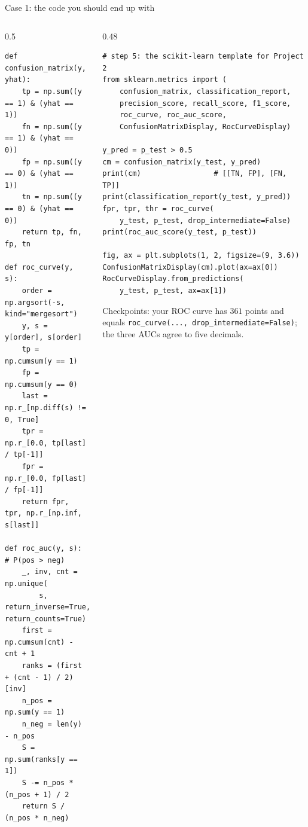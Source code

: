 \documentclass[10pt,aspectratio=169]{beamer}
\begin{document}
\begin{frame}[fragile]{Case 1: the code you should end up with}
\begin{columns}[T]
\begin{column}{0.5\textwidth}
\begin{lstlisting}
def confusion_matrix(y, yhat):
    tp = np.sum((y == 1) & (yhat == 1))
    fn = np.sum((y == 1) & (yhat == 0))
    fp = np.sum((y == 0) & (yhat == 1))
    tn = np.sum((y == 0) & (yhat == 0))
    return tp, fn, fp, tn

def roc_curve(y, s):
    order = np.argsort(-s, kind="mergesort")
    y, s = y[order], s[order]
    tp = np.cumsum(y == 1)
    fp = np.cumsum(y == 0)
    last = np.r_[np.diff(s) != 0, True]
    tpr = np.r_[0.0, tp[last] / tp[-1]]
    fpr = np.r_[0.0, fp[last] / fp[-1]]
    return fpr, tpr, np.r_[np.inf, s[last]]

def roc_auc(y, s):            # P(pos > neg)
    _, inv, cnt = np.unique(
        s, return_inverse=True, return_counts=True)
    first = np.cumsum(cnt) - cnt + 1
    ranks = (first + (cnt - 1) / 2)[inv]
    n_pos = np.sum(y == 1)
    n_neg = len(y) - n_pos
    S = np.sum(ranks[y == 1])
    S -= n_pos * (n_pos + 1) / 2
    return S / (n_pos * n_neg)
\end{lstlisting}
\end{column}
\begin{column}{0.48\textwidth}
\begin{lstlisting}
# step 5: the scikit-learn template for Project 2
from sklearn.metrics import (
    confusion_matrix, classification_report,
    precision_score, recall_score, f1_score,
    roc_curve, roc_auc_score,
    ConfusionMatrixDisplay, RocCurveDisplay)

y_pred = p_test > 0.5
cm = confusion_matrix(y_test, y_pred)
print(cm)                 # [[TN, FP], [FN, TP]]
print(classification_report(y_test, y_pred))
fpr, tpr, thr = roc_curve(
    y_test, p_test, drop_intermediate=False)
print(roc_auc_score(y_test, p_test))

fig, ax = plt.subplots(1, 2, figsize=(9, 3.6))
ConfusionMatrixDisplay(cm).plot(ax=ax[0])
RocCurveDisplay.from_predictions(
    y_test, p_test, ax=ax[1])
\end{lstlisting}
\scriptsize
Checkpoints: your ROC curve has $361$ points and equals
\texttt{roc\_curve(..., drop\_intermediate=False)}; the three AUCs agree
to five decimals.
\end{column}
\end{columns}
\end{frame}
\end{document}
